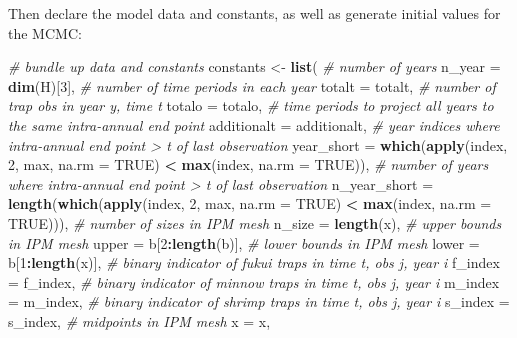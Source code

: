 \documentclass[
]{article}
\newenvironment{Shaded}{\begin{snugshade}}{\end{snugshade}}
\newcommand{\AttributeTok}[1]{\textcolor[rgb]{0.13,0.29,0.53}{#1}}
\newcommand{\CommentTok}[1]{\textcolor[rgb]{0.56,0.35,0.01}{\textit{#1}}}
\newcommand{\ConstantTok}[1]{\textcolor[rgb]{0.56,0.35,0.01}{#1}}
\newcommand{\DecValTok}[1]{\textcolor[rgb]{0.00,0.00,0.81}{#1}}
\newcommand{\FunctionTok}[1]{\textcolor[rgb]{0.13,0.29,0.53}{\textbf{#1}}}
\newcommand{\NormalTok}[1]{#1}
\newcommand{\OtherTok}[1]{\textcolor[rgb]{0.56,0.35,0.01}{#1}}
\newcommand{\SpecialCharTok}[1]{\textcolor[rgb]{0.81,0.36,0.00}{\textbf{#1}}}
\begin{document}
Then declare the model data and constants, as well as generate initial
values for the MCMC:

\begin{Shaded}
\begin{Highlighting}[]
\CommentTok{\# bundle up data and constants}
\NormalTok{constants }\OtherTok{\textless{}{-}} \FunctionTok{list}\NormalTok{(}
  \CommentTok{\# number of years}
  \AttributeTok{n\_year =} \FunctionTok{dim}\NormalTok{(H)[}\DecValTok{3}\NormalTok{],}
  \CommentTok{\# number of time periods in each year}
  \AttributeTok{totalt =}\NormalTok{ totalt,}
  \CommentTok{\# number of trap obs in year y, time t}
  \AttributeTok{totalo =}\NormalTok{ totalo,}
  \CommentTok{\# time periods to project all years to the same intra{-}annual end point}
  \AttributeTok{additionalt =}\NormalTok{ additionalt,}
  \CommentTok{\# year indices where intra{-}annual end point \textgreater{} t of last observation}
  \AttributeTok{year\_short =} \FunctionTok{which}\NormalTok{(}\FunctionTok{apply}\NormalTok{(index, }\DecValTok{2}\NormalTok{, max, }\AttributeTok{na.rm =} \ConstantTok{TRUE}\NormalTok{) }\SpecialCharTok{\textless{}}
                       \FunctionTok{max}\NormalTok{(index, }\AttributeTok{na.rm =} \ConstantTok{TRUE}\NormalTok{)),}
  \CommentTok{\# number of years where intra{-}annual end point \textgreater{} t of last observation}
  \AttributeTok{n\_year\_short =} \FunctionTok{length}\NormalTok{(}\FunctionTok{which}\NormalTok{(}\FunctionTok{apply}\NormalTok{(index, }\DecValTok{2}\NormalTok{, max, }\AttributeTok{na.rm =} \ConstantTok{TRUE}\NormalTok{) }\SpecialCharTok{\textless{}}
                                \FunctionTok{max}\NormalTok{(index, }\AttributeTok{na.rm =} \ConstantTok{TRUE}\NormalTok{))),}
  \CommentTok{\# number of sizes in IPM mesh}
  \AttributeTok{n\_size =} \FunctionTok{length}\NormalTok{(x),}
  \CommentTok{\# upper bounds in IPM mesh}
  \AttributeTok{upper =}\NormalTok{ b[}\DecValTok{2}\SpecialCharTok{:}\FunctionTok{length}\NormalTok{(b)],}
  \CommentTok{\# lower bounds in IPM mesh}
  \AttributeTok{lower =}\NormalTok{ b[}\DecValTok{1}\SpecialCharTok{:}\FunctionTok{length}\NormalTok{(x)],}
  \CommentTok{\# binary indicator of fukui traps in time t, obs j, year i}
  \AttributeTok{f\_index =}\NormalTok{ f\_index,}
  \CommentTok{\# binary indicator of minnow traps in time t, obs j, year i}
  \AttributeTok{m\_index =}\NormalTok{ m\_index,}
  \CommentTok{\# binary indicator of shrimp traps in time t, obs j, year i}
  \AttributeTok{s\_index =}\NormalTok{ s\_index,}
  \CommentTok{\# midpoints in IPM mesh}
  \AttributeTok{x =}\NormalTok{ x,}

\end{Highlighting}
\end{Shaded}
\end{document}
